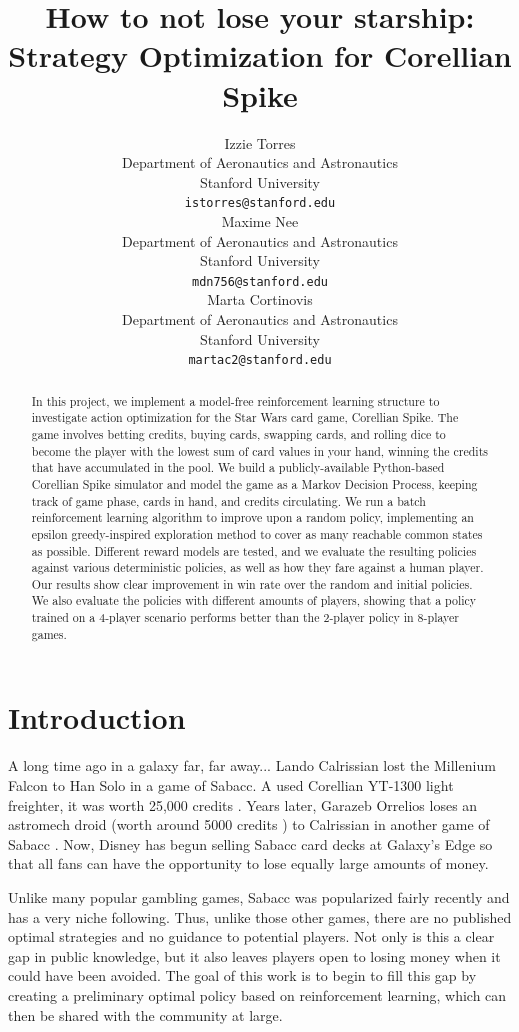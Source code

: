 \documentclass{article}
\title{How to not lose your starship: Strategy Optimization for Corellian Spike}
\author{ Izzie Torres\\
	Department of Aeronautics and Astronautics\\
	Stanford University\\
	\texttt{istorres@stanford.edu} \\
	\And
	{Maxime Nee} \\
	Department of Aeronautics and Astronautics\\
	Stanford University\\
	\texttt{mdn756@stanford.edu} \\
 	\And
	{Marta Cortinovis} \\
	Department of Aeronautics and Astronautics\\
	Stanford University\\
	\texttt{martac2@stanford.edu} \\
}
\date{}
\begin{document}
\maketitle

\begin{abstract}
In this project, we implement a model-free reinforcement learning structure to investigate action optimization for the Star Wars card game, Corellian Spike. The game involves betting credits, buying cards, swapping cards, and rolling dice to become the player with the lowest sum of card values in your hand, winning the credits that have accumulated in the pool. We build a publicly-available Python-based Corellian Spike simulator and model the game as a Markov Decision Process, keeping track of game phase, cards in hand, and credits circulating. We run a batch reinforcement learning algorithm to improve upon a random policy, implementing an epsilon greedy-inspired exploration method to cover as many reachable common states as possible. Different reward models are tested, and we evaluate the resulting policies against various deterministic policies, as well as how they fare against a human player. Our results show clear improvement in win rate over the random and initial policies. We also evaluate the policies with different amounts of players, showing that a policy trained on a 4-player scenario performs better than the 2-player policy in 8-player games.

\end{abstract}

\section{Introduction} %
A long time ago in a galaxy far, far away... Lando Calrissian lost the Millenium Falcon to Han Solo in a game of Sabacc. A used Corellian YT-1300 light freighter, it was worth 25,000 credits \cite{starship}.  Years later, Garazeb Orrelios loses an astromech droid (worth around 5000 credits \cite{astromech}) to Calrissian in another game of Sabacc \cite{rebels}. Now, Disney has begun selling Sabacc card decks at Galaxy's Edge so that all fans can have the opportunity to lose equally large amounts of money.

Unlike many popular gambling games, Sabacc was popularized fairly recently and has a very niche following. Thus, unlike those other games, there are no published optimal strategies and no guidance to potential players. Not only is this a clear gap in public knowledge, but it also leaves players open to losing money when it could have been avoided. The goal of this work is to begin to fill this gap by creating a preliminary optimal policy based on reinforcement learning, which can then be shared with the community at large.
\end{document}
